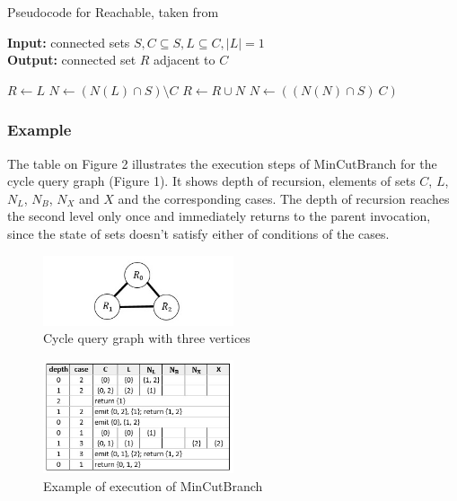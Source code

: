 \documentclass[10pt,journal,compsoc]{IEEEtran}
\begin{document}
\begin{algorithm}
\caption{Pseudocode for Reachable, taken from \cite{FenderMCB}}
\textbf{Input:} connected sets $S, C \subseteq S, L \subseteq C, |L| = 1$ \\
\textbf{Output:} connected set $R$ adjacent to $C$
\begin{algorithmic}[1]
\State $R \leftarrow L$
\State $N \leftarrow (N(L) \cap S) \setminus C$
\State $R \leftarrow R \cup N$
\State $N \leftarrow ((N(N) \cap S) \ C)$
\EndWhile
{}
\EndProcedure
\end{algorithmic}
\end{algorithm}

\subsubsection{Example}

The table on Figure 2 illustrates the execution steps of MinCutBranch for the cycle query graph (Figure 1). It shows depth of recursion, elements of sets $C$, $L$, $N_L$, $N_B$, $N_X$ and $X$ and the corresponding cases. The depth of recursion reaches the second level only once and immediately returns to the parent invocation, since the state of sets doesn't satisfy either of conditions of the cases.

\begin{figure}[h]
\includegraphics[width=0.5\textwidth]{graph.jpg}
\caption{Cycle query graph with three vertices}
\end{figure}

\begin{figure}[h]
\includegraphics[width=0.5\textwidth]{table.jpg}
\caption{Example of execution of MinCutBranch}
\end{figure}
\end{document}

